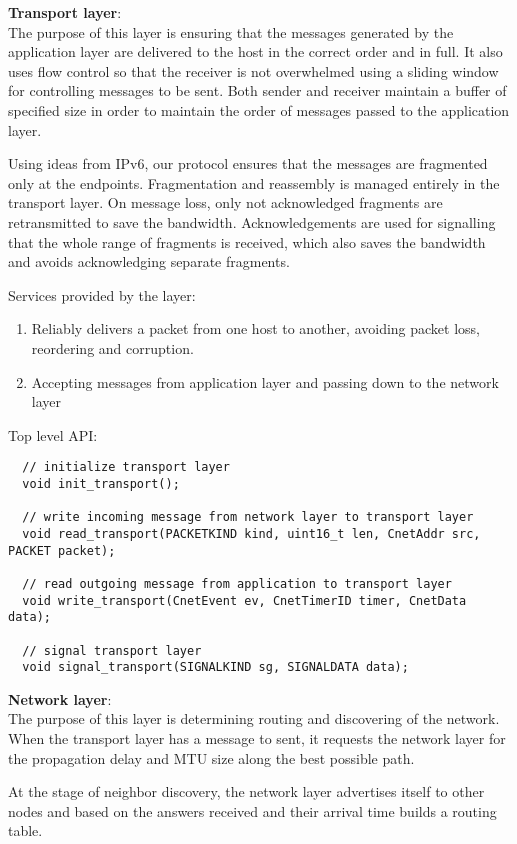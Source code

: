 \documentclass[11pt,a4paper,oneside]{report}
\begin{document}
\noindent \textbf{Transport layer}: \\
The purpose of this layer is ensuring that the messages generated by the
application layer are delivered to the host in the correct order and in full.
It also uses flow control so that the receiver is not overwhelmed using a
sliding window for controlling messages to be sent. Both sender and receiver 
maintain a buffer of specified size in order to maintain the order of messages 
passed to the application layer.

Using ideas from IPv6, our protocol ensures that the messages are fragmented
only at the endpoints. Fragmentation and reassembly is managed entirely in the
transport layer. On message loss, only not acknowledged fragments are
retransmitted to save the bandwidth. Acknowledgements are used for signalling
that the whole range of fragments is received, which also saves the bandwidth
and avoids acknowledging separate fragments.
    
Services provided by the layer:
\begin{enumerate}
  \item Reliably delivers a packet from one host to another, avoiding
   packet loss, reordering and corruption.
   \item Accepting messages from application layer and passing down to the
   network layer
\end{enumerate}
    \newpage
    Top level API:  
  \begin{lstlisting}
  // initialize transport layer 
  void init_transport();
  
  // write incoming message from network layer to transport layer
  void read_transport(PACKETKIND kind, uint16_t len, CnetAddr src, PACKET packet);
  
  // read outgoing message from application to transport layer
  void write_transport(CnetEvent ev, CnetTimerID timer, CnetData data);
  
  // signal transport layer
  void signal_transport(SIGNALKIND sg, SIGNALDATA data);
  \end{lstlisting}
   
\noindent \textbf{Network layer}: \\
The purpose of this layer is determining routing and discovering of the
network. When the transport layer has a message to sent, it requests the
network layer for the propagation delay and MTU size along the best possible
path. 

At the stage of neighbor discovery, the network layer advertises itself to other
nodes and based on the answers received and their arrival time builds a routing
table.
\end{document}
